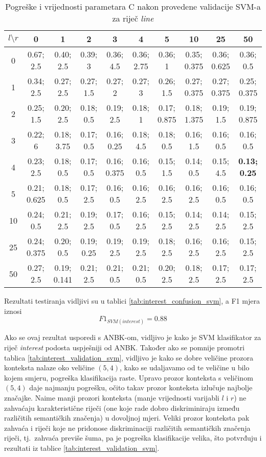 \documentclass[10pt, a4paper]{article}
\begin{document}
\begin{table*}[!hbtp]
\caption{Pogreške i vrijednosti parametara C nakon provedene validacije SVM-a za riječ \emph{line}}
\label{tab:line_validation_svm}
\begin{center}
\begin{tabular}{|c|ccccccccc|}
\hline
$l \setminus r$ & 0 & 1 & 2 & 3 & 4 & 5 & 10 & 25 & 50 \\
\hline
0 & 0.67; 2.5 & 0.40; 2.5 & 0.39; 3 & 0.36; 4.5 & 0.36; 2.75 & 0.36; 1 & 0.35; 0.375 & 0.36; 0.625 & 0.36; 0.5 \\
1 & 0.34; 2.5 & 0.27; 2.5 & 0.27; 1.5 & 0.27; 2 & 0.27; 3 & 0.26; 1.5 & 0.27; 0.375 & 0.27; 0.375 & 0.25; 0.375 \\
2 & 0.25; 1.5 & 0.20; 2.5 & 0.18; 0.5 & 0.19; 2.5 & 0.18; 1 & 0.17; 0.875 & 0.18; 1.375 & 0.19; 1.5 & 0.19; 0.875 \\
3 & 0.22; 6 & 0.18; 3.75 & 0.17; 0.5 & 0.16; 0.25 & 0.18; 4.5 & 0.18; 0.5 & 0.16; 1.5 & 0.16; 0.5 & 0.16; 0.5 \\
4 & 0.23; 2.5 & 0.18; 0.5 & 0.17; 0.5 & 0.16; 0.375 & 0.16; 0.5 & 0.15; 1.5 & 0.14; 0.5 & 0.15; 4.5 & \textbf{0.13; 0.25} \\
5 & 0.21; 0.625 & 0.18; 0.5 & 0.17; 2.5 & 0.16; 0.5 & 0.16; 2.5 & 0.16; 2.5 & 0.16; 2.5 & 0.16; 0.5 & 0.16; 0.5 \\
10 & 0.24; 0.5 & 0.21; 2.5 & 0.19; 2.5 & 0.17; 0.5 & 0.16; 2.5 & 0.15; 2.5 & 0.14; 2.5 & 0.14; 2.5 & 0.15; 2.5 \\
25 & 0.24; 0.375 & 0.20; 0.5 & 0.19; 0.25 & 0.19; 2.5 & 0.19; 2.5 & 0.18; 2.5 & 0.16; 2.5 & 0.16; 2.5 & 0.15; 2.5 \\
50 & 0.27; 2.5 & 0.19; 0.141 & 0.21; 2.5 & 0.21; 0.5 & 0.21; 0.5 & 0.20; 2.5 & 0.18; 2.5 & 0.17; 2.5 & 0.17; 2.5 \\
\hline
\end{tabular}
\end{center}
\end{table*}
Rezultati testiranja vidljivi su u tablici \ref{tab:interest_confusion_svm},
a F1 mjera iznosi
\begin{equation}
\label{eq:f1_svm_interest}
F1_{SVM(interest)} = 0.88
\end{equation}

Ako se ovaj rezultat usporedi s ANBK-om, vidljivo je kako je SVM klasifikator za riječ \emph{interest} podosta uspješniji od ANBK.
Također ako se pomnije promotri tablica \ref{tab:interest_validation_svm}, vidljivo je kako se dobre veličine
prozora konteksta nalaze oko veličine $(5,4)$, 
kako se udaljavamo od te veličine u bilo kojem smjeru, pogreška klasifikacija raste.
Upravo prozor konteksta s veličinom $(5, 4)$ daje najmanju pogrešku,
očito takav prozor konteksta izlučuje najbolje značajke.
Naime manji prozori konteksta (manje vrijednosti varijabli $l$ i $r$) 
ne zahvaćaju karakteristične riječi (one koje rade dobro diskriminiraju između različitih semantičkih značenja) u dovoljnoj mjeri.
Veliki prozor konteksta pak zahvaća i riječi koje ne pridonose diskriminaciji
različitih semantičkih značenja riječi, tj.~zahvaća previše šuma, pa je
pogreška klasifikacije velika, što potvrđuju i rezultati iz tablice \ref{tab:interest_validation_svm}.
\end{document}

